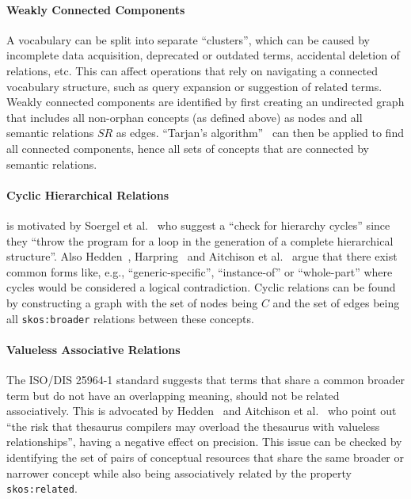 \paragraph{Weakly Connected Components}

A vocabulary can be split into separate ``clusters'', which can be caused by incomplete data acquisition, deprecated or outdated terms, accidental deletion of relations, etc. This can affect operations that rely on navigating a connected vocabulary structure, such as query expansion or suggestion of related terms.
Weakly connected components are identified by first creating an undirected graph that includes all non-orphan concepts (as defined above) as nodes and all semantic relations $SR$ as edges. ``Tarjan’s algorithm''~\cite{Hopcroft1973} can then be applied to find all connected components, hence all sets of concepts that are connected by semantic relations.

\paragraph{Cyclic Hierarchical Relations}

is motivated by Soergel et al.~\cite{Soergel2002} who suggest a ``check for hierarchy cycles'' since they ``throw the program for a loop in the generation of a complete hierarchical structure''. Also Hedden~\cite{Hedden2010}, Harpring~\cite{Harpring2010} and Aitchison et al.~\cite{Aitchison2000} argue that there exist common forms like, e.g., ``generic-specific'', ``instance-of'' or ``whole-part'' where cycles would be considered a logical contradiction.
Cyclic relations can be found by constructing a graph with the set of nodes being $C$ and the set of edges being all \texttt{skos:broader} relations between these concepts.

\paragraph{Valueless Associative Relations}

The ISO/DIS 25964-1 standard \cite{ISO25964-1:2011} suggests that terms that share a common broader term but do not have an overlapping meaning, should not be related associatively. This is advocated by Hedden~\cite{Hedden2010} and Aitchison et al.~\cite{Aitchison2000} who point out ``the risk that thesaurus compilers may overload the thesaurus with valueless relationships'', having a negative effect on precision.
This issue can be checked by identifying the set of pairs of conceptual resources that share the same broader or narrower concept while also being associatively related by the property \texttt{skos:related}.

